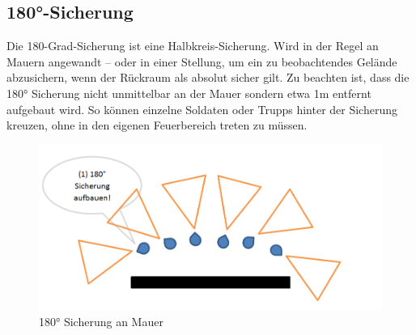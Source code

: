 \subsection{180°-Sicherung}
	Die 180-Grad-Sicherung ist eine Halbkreis-Sicherung. Wird in der Regel an Mauern angewandt – oder in einer Stellung, um ein zu beobachtendes Gelände abzusichern, wenn der Rückraum als absolut sicher gilt. Zu beachten ist, dass die 180° Sicherung nicht unmittelbar an der Mauer sondern etwa 1m entfernt aufgebaut wird. So können einzelne Soldaten oder Trupps hinter der Sicherung kreuzen, ohne in den eigenen Feuerbereich treten zu müssen. \\
	\begin{figure}[htbp]
		\centering
		\includegraphics[width=15cm]{./img/grundlagen/sicherungen/180er.png}
		\caption{180° Sicherung an Mauer}
		\end{figure}
\newpage